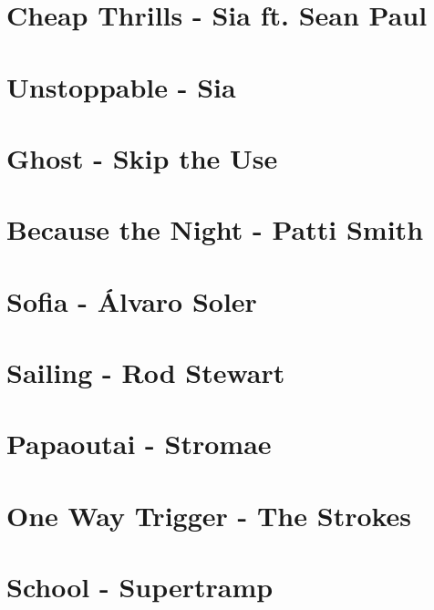\documentclass[11pt]{article}
\begin{document}
\section{Cheap Thrills - Sia ft. Sean Paul}


\section{Unstoppable - Sia}
\begin{guitar}

\end{guitar}

\section{Ghost - Skip the Use}


\section{Because the Night - Patti Smith}


\section{Sofia - Álvaro Soler}
\begin{guitar}

\end{guitar}

\section{Sailing - Rod Stewart}


\section{Papaoutai - Stromae}


\section{One Way Trigger - The Strokes}


\section{School - Supertramp}

\end{document}
